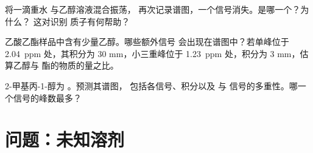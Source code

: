 \begin{exercise}[$\star\star\star$]\label{exo:g12:proton-nmr:13}
将一滴重水  与乙醇溶液混合振荡，
再次记录谱图，一个信号消失。是哪一个？为什么？
这对识别  质子有何帮助？
\end{exercise}

\begin{exercise}[$\star\star\star$]\label{exo:g12:proton-nmr:14}
乙酸乙酯样品中含有少量乙醇。哪些额外信号
会出现在谱图中？若单峰位于
\qty{2.04}{ppm} 处，其积分为 30 mm，小三重峰位于
\qty{1.23}{ppm} 处，积分为 3 mm，估算乙醇与
酯的物质的量之比。
\end{exercise}

\begin{exercise}[$\star\star\star$]\label{exo:g12:proton-nmr:15}
2-甲基丙-1-醇为 。预测其谱图，
包括各信号、积分以及  与
 信号的多重性。哪一个信号的峰数最多？
\end{exercise}

\section{问题：未知溶剂}

